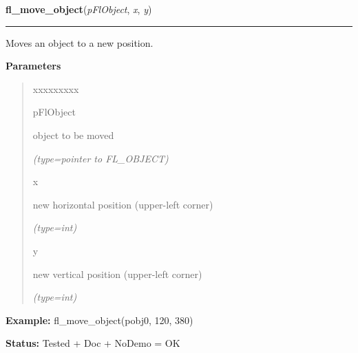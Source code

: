     \label{xformslib:flbasic:fl_move_object}

    \vspace{0.5ex}

\hspace{.8\funcindent}\begin{boxedminipage}{\funcwidth}

    \raggedright \textbf{fl\_move\_object}(\textit{pFlObject}, \textit{x}, \textit{y})

    \vspace{-1.5ex}

    \rule{\textwidth}{0.5\fboxrule}
\setlength{\parskip}{2ex}
    Moves an object to a new position.

\setlength{\parskip}{1ex}
      \textbf{Parameters}
      \vspace{-1ex}

      \begin{quote}
        \begin{Ventry}{xxxxxxxxx}

          \item[pFlObject]

          object to be moved

            {\it (type=pointer to FL\_OBJECT)}

          \item[x]

          new horizontal position (upper-left corner)

            {\it (type=int)}

          \item[y]

          new vertical position (upper-left corner)

            {\it (type=int)}

        \end{Ventry}

      \end{quote}

\textbf{Example:} fl\_move\_object(pobj0, 120, 380)



\textbf{Status:} Tested + Doc + NoDemo = OK



    \end{boxedminipage}

    \label{xformslib:flbasic:fl_fit_object_label}

